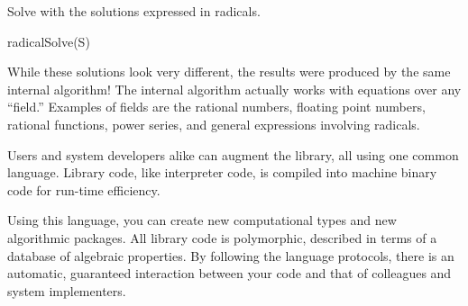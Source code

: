 \begin{xtc}
\begin{xtccomment}
Solve  with the solutions expressed in radicals.
\end{xtccomment}
\begin{spadsrc}
radicalSolve(S)
\end{spadsrc}
\begin{TeXOutput}
\begin{fricasmath}{3}
%
\end{fricasmath}
\end{TeXOutput}
\end{xtc}

While these solutions look very different, the results were
produced by the same internal algorithm!
The internal algorithm actually works with equations over any ``field.''
Examples of fields are the rational numbers, floating point
numbers, rational functions, power series, and general expressions
involving radicals.


Users and system developers alike can augment the \Language{}
library, all using one common language.
Library code, like interpreter code, is compiled into machine
binary code for run-time efficiency.

Using this language, you can create new computational types and
new algorithmic packages.
All library code is polymorphic, described in terms of a database
of algebraic properties.
By following the language protocols, there is an automatic,
guaranteed interaction between your code and that of colleagues
and system implementers.

